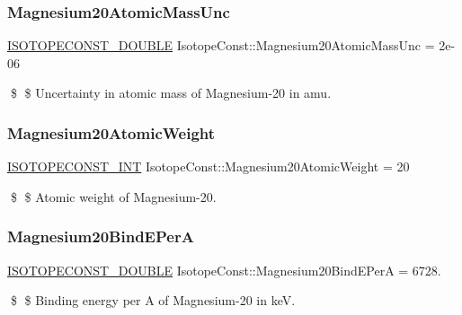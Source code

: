 \subsubsection{\texorpdfstring{Magnesium20\+Atomic\+Mass\+Unc}{Magnesium20AtomicMassUnc}}
{\footnotesize\ttfamily \mbox{\hyperlink{group___isotope_const-_macros_ga8f45a7272ce02c0b4c65c44636ed719a}{I\+S\+O\+T\+O\+P\+E\+C\+O\+N\+S\+T\+\_\+\+D\+O\+U\+B\+LE}} Isotope\+Const\+::\+Magnesium20\+Atomic\+Mass\+Unc = 2e-\/06}

\$ \$ Uncertainty in atomic mass of Magnesium-\/20 in amu. \mbox{\label{group___isotope_const-_magnesium-_mg20_gab1ab8251d92f8e63bfaeffa2217439fb}} 
\subsubsection{\texorpdfstring{Magnesium20\+Atomic\+Weight}{Magnesium20AtomicWeight}}
{\footnotesize\ttfamily \mbox{\hyperlink{group___isotope_const-_macros_ga5f18360b3e99483a35c32d789e62621c}{I\+S\+O\+T\+O\+P\+E\+C\+O\+N\+S\+T\+\_\+\+I\+NT}} Isotope\+Const\+::\+Magnesium20\+Atomic\+Weight = 20}

\$ \$ Atomic weight of Magnesium-\/20. \mbox{\label{group___isotope_const-_magnesium-_mg20_ga8028ba9cfd5a84c84f0e6357ab0b2e03}} 
\subsubsection{\texorpdfstring{Magnesium20\+Bind\+E\+PerA}{Magnesium20BindEPerA}}
{\footnotesize\ttfamily \mbox{\hyperlink{group___isotope_const-_macros_ga8f45a7272ce02c0b4c65c44636ed719a}{I\+S\+O\+T\+O\+P\+E\+C\+O\+N\+S\+T\+\_\+\+D\+O\+U\+B\+LE}} Isotope\+Const\+::\+Magnesium20\+Bind\+E\+PerA = 6728.}

\$ \$ Binding energy per A of Magnesium-\/20 in keV. \mbox{\label{group___isotope_const-_magnesium-_mg20_gad55f5ea6eb866fc5c9526ff25212ea0f}} 
